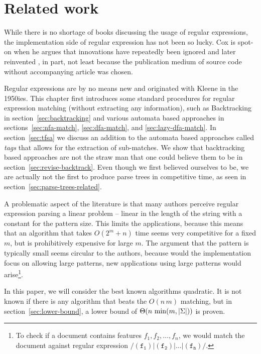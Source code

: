 \documentclass[11pt,a4paper,twoside,openright]{Thesis}
\theoremstyle{definition}
\newcommand{\regex}[1]{\ensuremath{\mathtt{/#1/}}}
\newcommand{\Secref}[1]{section~\ref{sec:#1}}
\newcommand{\seclabel}[1]{\label{sec:#1}}
\begin{document}
\chapter{Related work}
\seclabel{related}
While there is no shortage of books discussing the usage of regular
expressions, the implementation side of regular expression has not
been so lucky. Cox is spot-on when he argues that innovations have
repeatedly been ignored and later reinvented \cite{Cox07a,Cox09a,Cox10a}, in 
part, not least because the publication medium of source code without
accompanying article was chosen.

Regular expressions are by no means new and originated with Kleene in the
1950ies\cite{Sips05a}. This chapter first introduces some standard
procedures for regular expression matching (without extracting any
information), such as Backtracking in \Secref{backtracking} and various
automata based approaches in sections~\ref{sec:nfa-match}, \ref{sec:dfa-match},
and \ref{sec:lazy-dfa-match}. In \Secref{tfsa} we discuss an addition to
the automata based approaches called \emph{tags} that allows for the extraction
of sub-matches. We show that backtracking based approaches are not the
straw man that one could believe them to be in \Secref{revise-backtrack}.
Even though we first believed ourselves to be, we are actually not the first
to produce parse trees in competitive time, as seen in \Secref{parse-trees-related}.

A problematic aspect of the literature is that many authors perceive regular 
expression parsing a linear problem -- linear in the length of the string 
with a constant for the pattern size. This limits the applications, because 
this means that an algorithm that takes $O(2^m+n)$ time seems very 
competitive for a fixed $m$, but is prohibitively expensive for large $m$. 
The argument that the pattern is typically small seems circular to the 
authors, because would the implementation focus on allowing large patterns, 
new applications using large patterns would arise\footnote{To check if a document
contains features $f_1, f_2, \dots, f_n$, we would match the document
against regular expression \regex{(f_1)|(f_2)|\dots|(f_n)}.}.

In this paper, we will consider the best known algorithms quadratic. It is 
not known if there is any algorithm that beats the $O(n\, m)$ matching, but 
in \Secref{lower-bound}, a lower bound of $\Theta(n\, \min(m, \left|\Sigma\right|))$ 
is proven.
\end{document}
